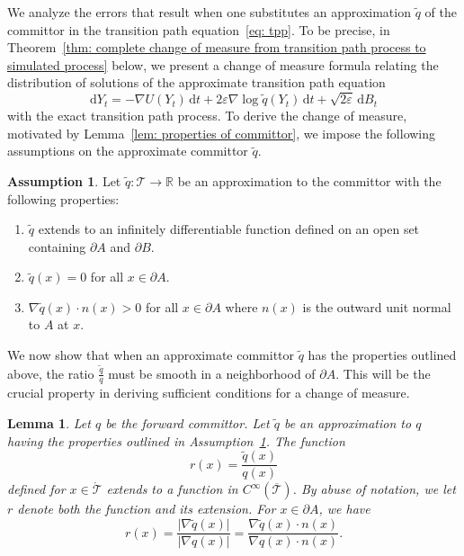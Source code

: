 \documentclass[reqno]{amsart}
\newcommand{\Real}{\mathbb{R}}
\newcommand{\eps}{\varepsilon}
\newcommand{\1}{\mathds{1}}
\renewcommand{\d}{\mathrm{d}}
\newcommand{\grad}{\nabla}
\newtheorem{lemma}{Lemma}
\theoremstyle{definition}
\newtheorem{assumption}{Assumption}
\theoremstyle{remark}
\newcommand{\D}{\mathscr{T}}
\begin{document}
We analyze the errors that result when one substitutes an approximation $\tilde q$ of the committor in the transition path equation~\eqref{eq: tpp}. To be precise, in Theorem~\ref{thm: complete change of measure from transition path process to simulated process} below, we present a change of measure formula relating the distribution of solutions of the approximate transition path equation 
\begin{equation}
  \label{eq: approximate tpp}
  \d Y_t = -\grad U (Y_t) \, \d t + 2 \eps \grad \log \tilde q(Y_t) \, \d t + \sqrt{2 \eps}\, \d B_t
\end{equation}
with the exact transition path process. To derive the change of measure, motivated by Lemma~\ref{lem: properties of committor}, we impose the following assumptions on the approximate committor $\tilde q$.

\begin{assumption}\label{asm: properties of approximate committor}
  Let $\tilde q : \D \rightarrow \Real$ be an approximation to the committor with the following properties:
  \begin{enumerate}[1)]
  \item $\tilde q$ extends to an infinitely differentiable function defined on an open set containing $\partial A$ and $\partial B$. 
  \item $\tilde q(x) = 0$ for all $x \in \partial A$.
    \item $\grad \tilde q(x) \cdot n(x) >0$ for all $x \in \partial A$ where $n(x)$ is the outward unit normal to $A$ at $x$.
  \end{enumerate}
\end{assumption}

We now show that when an approximate committor $\tilde q$ has the properties outlined above, the ratio $\frac{\tilde q}{q}$ must be smooth in a neighborhood of $\partial A$. This will be the crucial property in deriving sufficient conditions for a change of measure.  

\begin{lemma} \label{lem: ratio function is smooth}
  Let $q$ be the forward committor. Let $\tilde q$ be an approximation to $q$ having the properties outlined in Assumption~\ref{asm: properties of approximate committor}.
  The function
  \begin{equation*}
    r(x) = \frac{\tilde q(x)}{q(x)}
  \end{equation*}
  defined for $x \in \mathring{\D}$ extends to a function in $C^\infty(\overline{\D})$. By abuse of notation, we let $r$ denote both the function and its extension. For $x \in \partial A$, we have
  \begin{equation*}
     r(x) = \frac{\lvert \grad \tilde q(x) \rvert}{\lvert \grad q(x) \rvert} = \frac{\grad \tilde q(x) \cdot n(x)}{\grad q(x) \cdot n(x)}.
  \end{equation*}
\end{lemma}
\end{document}
